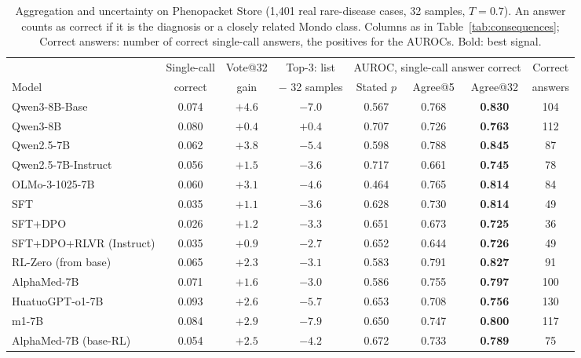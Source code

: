 \documentclass[11pt]{article}
\begin{document}
\begin{table}[t]
\centering\small
\begin{adjustbox}{max width=\linewidth}
\begin{tabular}{lccccccc}
\toprule
 & Single-call & Vote@32 & Top-3: list & \multicolumn{3}{c}{AUROC, single-call answer correct} & Correct \\
Model & correct & gain & $-$ 32 samples & Stated $p$ & Agree@5 & Agree@32 & answers \\
\midrule
Qwen3-8B-Base & 0.074 & $+4.6$ & $-7.0$ & 0.567 & 0.768 & \textbf{0.830} & 104 \\
Qwen3-8B & 0.080 & $+0.4$ & $+0.4$ & 0.707 & 0.726 & \textbf{0.763} & 112 \\
Qwen2.5-7B & 0.062 & $+3.8$ & $-5.4$ & 0.598 & 0.788 & \textbf{0.845} & 87 \\
Qwen2.5-7B-Instruct & 0.056 & $+1.5$ & $-3.6$ & 0.717 & 0.661 & \textbf{0.745} & 78 \\
\midrule
OLMo-3-1025-7B & 0.060 & $+3.1$ & $-4.6$ & 0.464 & 0.765 & \textbf{0.814} & 84 \\
\quad SFT & 0.035 & $+1.1$ & $-3.6$ & 0.628 & 0.730 & \textbf{0.814} & 49 \\
\quad SFT+DPO & 0.026 & $+1.2$ & $-3.3$ & 0.651 & 0.673 & \textbf{0.725} & 36 \\
\quad SFT+DPO+RLVR (Instruct) & 0.035 & $+0.9$ & $-2.7$ & 0.652 & 0.644 & \textbf{0.726} & 49 \\
\quad RL-Zero (from base) & 0.065 & $+2.3$ & $-3.1$ & 0.583 & 0.791 & \textbf{0.827} & 91 \\
\midrule
AlphaMed-7B & 0.071 & $+1.6$ & $-3.0$ & 0.586 & 0.755 & \textbf{0.797} & 100 \\
HuatuoGPT-o1-7B & 0.093 & $+2.6$ & $-5.7$ & 0.653 & 0.708 & \textbf{0.756} & 130 \\
m1-7B & 0.084 & $+2.9$ & $-7.9$ & 0.650 & 0.747 & \textbf{0.800} & 117 \\
AlphaMed-7B (base-RL) & 0.054 & $+2.5$ & $-4.2$ & 0.672 & 0.733 & \textbf{0.789} & 75 \\
\bottomrule
\end{tabular}
\end{adjustbox}
\caption{Aggregation and uncertainty on Phenopacket Store (1,401 real rare-disease cases, 32 samples, $T{=}0.7$). An answer counts as correct if it is the diagnosis or a closely related Mondo class. Columns as in Table~\ref{tab:consequences}; Correct answers: number of correct single-call answers, the positives for the AUROCs. Bold: best signal.}
\label{tab:pheno}
\end{table}
\end{document}
